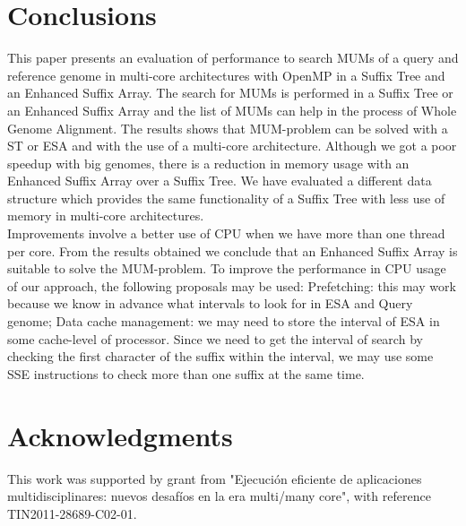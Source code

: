 \documentclass[runningheads,a4paper]{llncs}
\begin{document}
\section{Conclusions}
This paper presents an evaluation of performance to search MUMs of a query and reference genome in multi-core architectures with OpenMP in a Suffix Tree and an Enhanced Suffix Array. The search for MUMs is performed in a Suffix Tree or an Enhanced Suffix Array and the list of MUMs can help in the process of Whole Genome Alignment. The results shows that MUM-problem can be solved with a ST or ESA and with the use of a multi-core architecture. Although we got a poor speedup with big genomes, there is a reduction in memory usage with an Enhanced Suffix Array over a Suffix Tree. We have evaluated a different data structure which provides the same functionality of a Suffix Tree with less use of memory in multi-core architectures.\\
Improvements involve a better use of CPU when we have more than one thread per core. From the results obtained we conclude that an Enhanced Suffix Array is suitable to solve the MUM-problem. To improve the performance in CPU usage of our approach, the following proposals may be used: Prefetching: this may work because we know in advance what intervals to look for in ESA and Query genome; Data cache management: we may need to store the interval of ESA in some cache-level of processor. Since we need to get the interval of search by checking the first character of the suffix within the interval, we may use some SSE instructions to check more than one suffix at the same time.
\section{Acknowledgments}
This work was supported by grant from "Ejecuci\'on eficiente de aplicaciones multidisciplinares: nuevos desaf\'ios en la era multi/many core", with reference TIN2011-28689-C02-01.

  
\end{document}
